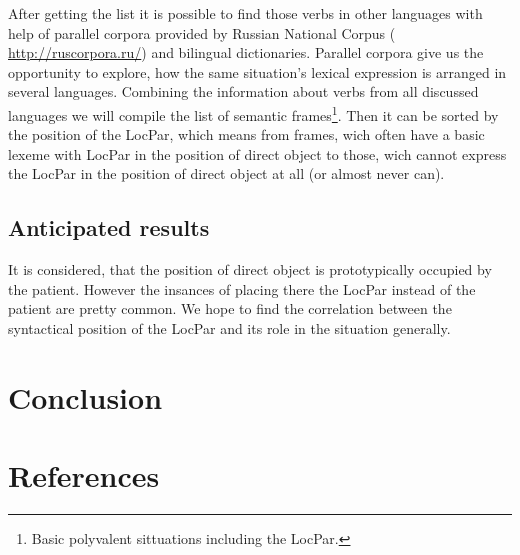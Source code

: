After getting the list it is possible to find those verbs in other languages with help of parallel corpora provided by Russian National Corpus (\small{ \url{http://ruscorpora.ru/}}) \normalsize  and bilingual dictionaries. Parallel corpora give us the opportunity to explore, how the same situation's lexical expression is arranged in several languages. Combining the information about verbs from all discussed languages we will compile the list of semantic frames\footnote{Basic polyvalent sittuations including the LocPar.}. Then it can be sorted by the position of the LocPar, which means from frames, wich often have a basic lexeme with LocPar in the position of direct object to those, wich cannot express the LocPar in the position of direct object at all (or almost never can). 

\subsection{Anticipated results}

It is considered, that the position of direct object is prototypically occupied by the patient. However the insances of placing there the LocPar instead of the patient are pretty common. We hope to find the correlation between the syntactical position of the LocPar and its role in the situation generally. 

\section{Conclusion}


\section{References}
\renewcommand{\bibsection}{}
 












